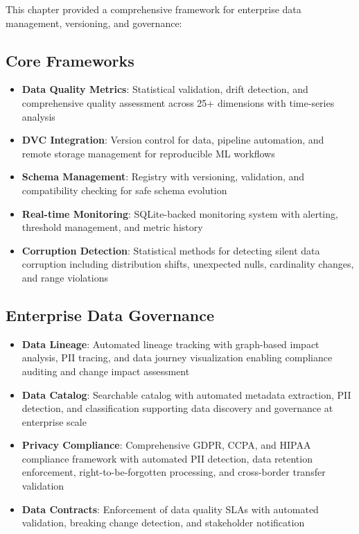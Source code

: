 This chapter provided a comprehensive framework for enterprise data management, versioning, and governance:

\subsection{Core Frameworks}

\begin{itemize}
    \item \textbf{Data Quality Metrics}: Statistical validation, drift detection, and comprehensive quality assessment across 25+ dimensions with time-series analysis

    \item \textbf{DVC Integration}: Version control for data, pipeline automation, and remote storage management for reproducible ML workflows

    \item \textbf{Schema Management}: Registry with versioning, validation, and compatibility checking for safe schema evolution

    \item \textbf{Real-time Monitoring}: SQLite-backed monitoring system with alerting, threshold management, and metric history

    \item \textbf{Corruption Detection}: Statistical methods for detecting silent data corruption including distribution shifts, unexpected nulls, cardinality changes, and range violations
\end{itemize}

\subsection{Enterprise Data Governance}

\begin{itemize}
    \item \textbf{Data Lineage}: Automated lineage tracking with graph-based impact analysis, PII tracing, and data journey visualization enabling compliance auditing and change impact assessment

    \item \textbf{Data Catalog}: Searchable catalog with automated metadata extraction, PII detection, and classification supporting data discovery and governance at enterprise scale

    \item \textbf{Privacy Compliance}: Comprehensive GDPR, CCPA, and HIPAA compliance framework with automated PII detection, data retention enforcement, right-to-be-forgotten processing, and cross-border transfer validation

    \item \textbf{Data Contracts}: Enforcement of data quality SLAs with automated validation, breaking change detection, and stakeholder notification
\end{itemize}

